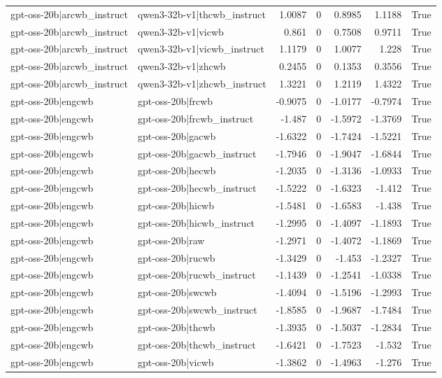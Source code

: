 \begin{table}
\begin{tabular}{l l r r r r l}
gpt-oss-20b|arcwb_instruct & qwen3-32b-v1|thcwb_instruct & 1.0087 & 0 & 0.8985 & 1.1188 & True \\
gpt-oss-20b|arcwb_instruct & qwen3-32b-v1|vicwb & 0.861 & 0 & 0.7508 & 0.9711 & True \\
gpt-oss-20b|arcwb_instruct & qwen3-32b-v1|vicwb_instruct & 1.1179 & 0 & 1.0077 & 1.228 & True \\
gpt-oss-20b|arcwb_instruct & qwen3-32b-v1|zhcwb & 0.2455 & 0 & 0.1353 & 0.3556 & True \\
gpt-oss-20b|arcwb_instruct & qwen3-32b-v1|zhcwb_instruct & 1.3221 & 0 & 1.2119 & 1.4322 & True \\
gpt-oss-20b|engcwb & gpt-oss-20b|frcwb & -0.9075 & 0 & -1.0177 & -0.7974 & True \\
gpt-oss-20b|engcwb & gpt-oss-20b|frcwb_instruct & -1.487 & 0 & -1.5972 & -1.3769 & True \\
gpt-oss-20b|engcwb & gpt-oss-20b|gacwb & -1.6322 & 0 & -1.7424 & -1.5221 & True \\
gpt-oss-20b|engcwb & gpt-oss-20b|gacwb_instruct & -1.7946 & 0 & -1.9047 & -1.6844 & True \\
gpt-oss-20b|engcwb & gpt-oss-20b|hecwb & -1.2035 & 0 & -1.3136 & -1.0933 & True \\
gpt-oss-20b|engcwb & gpt-oss-20b|hecwb_instruct & -1.5222 & 0 & -1.6323 & -1.412 & True \\
gpt-oss-20b|engcwb & gpt-oss-20b|hicwb & -1.5481 & 0 & -1.6583 & -1.438 & True \\
gpt-oss-20b|engcwb & gpt-oss-20b|hicwb_instruct & -1.2995 & 0 & -1.4097 & -1.1893 & True \\
gpt-oss-20b|engcwb & gpt-oss-20b|raw & -1.2971 & 0 & -1.4072 & -1.1869 & True \\
gpt-oss-20b|engcwb & gpt-oss-20b|rucwb & -1.3429 & 0 & -1.453 & -1.2327 & True \\
gpt-oss-20b|engcwb & gpt-oss-20b|rucwb_instruct & -1.1439 & 0 & -1.2541 & -1.0338 & True \\
gpt-oss-20b|engcwb & gpt-oss-20b|swcwb & -1.4094 & 0 & -1.5196 & -1.2993 & True \\
gpt-oss-20b|engcwb & gpt-oss-20b|swcwb_instruct & -1.8585 & 0 & -1.9687 & -1.7484 & True \\
gpt-oss-20b|engcwb & gpt-oss-20b|thcwb & -1.3935 & 0 & -1.5037 & -1.2834 & True \\
gpt-oss-20b|engcwb & gpt-oss-20b|thcwb_instruct & -1.6421 & 0 & -1.7523 & -1.532 & True \\
gpt-oss-20b|engcwb & gpt-oss-20b|vicwb & -1.3862 & 0 & -1.4963 & -1.276 & True \\

\end{tabular}
\end{table}
